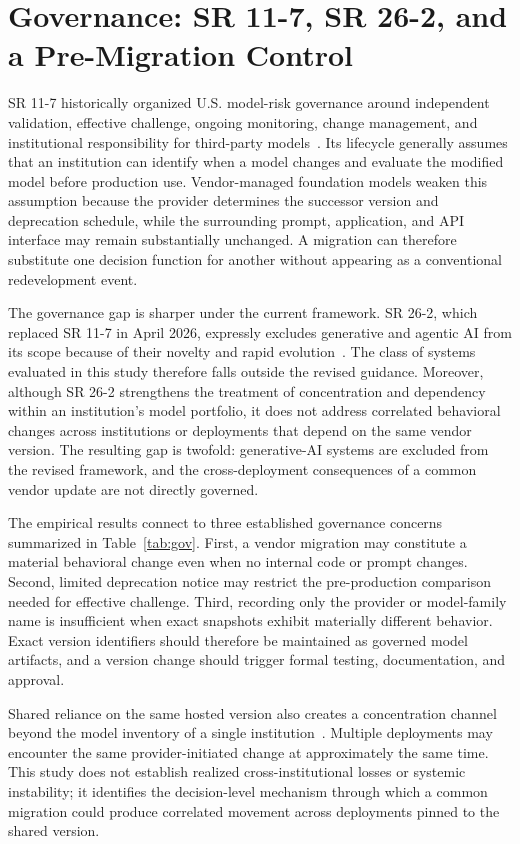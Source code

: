 \documentclass[11pt]{article}
\begin{document}
\section{Governance: SR 11-7, SR 26-2, and a Pre-Migration Control}
\label{sec:gov}
SR 11-7 historically organized U.S. model-risk governance around independent validation, effective challenge, ongoing monitoring, change management, and institutional responsibility for third-party models~\cite{sr117}. Its lifecycle generally assumes that an institution can identify when a model changes and evaluate the modified model before production use. Vendor-managed foundation models weaken this assumption because the provider determines the successor version and deprecation schedule, while the surrounding prompt, application, and API interface may remain substantially unchanged. A migration can therefore substitute one decision function for another without appearing as a conventional redevelopment event.

The governance gap is sharper under the current framework. SR 26-2, which replaced SR 11-7 in April 2026, expressly excludes generative and agentic AI from its scope because of their novelty and rapid evolution~\cite{sr2602}. The class of systems evaluated in this study therefore falls outside the revised guidance. Moreover, although SR 26-2 strengthens the treatment of concentration and dependency within an institution's model portfolio, it does not address correlated behavioral changes across institutions or deployments that depend on the same vendor version. The resulting gap is twofold: generative-AI systems are excluded from the revised framework, and the cross-deployment consequences of a common vendor update are not directly governed.

The empirical results connect to three established governance concerns summarized in Table~\ref{tab:gov}. First, a vendor migration may constitute a material behavioral change even when no internal code or prompt changes. Second, limited deprecation notice may restrict the pre-production comparison needed for effective challenge. Third, recording only the provider or model-family name is insufficient when exact snapshots exhibit materially different behavior. Exact version identifiers should therefore be maintained as governed model artifacts, and a version change should trigger formal testing, documentation, and approval.

Shared reliance on the same hosted version also creates a concentration channel beyond the model inventory of a single institution~\cite{esrb}. Multiple deployments may encounter the same provider-initiated change at approximately the same time. This study does not establish realized cross-institutional losses or systemic instability; it identifies the decision-level mechanism through which a common migration could produce correlated movement across deployments pinned to the shared version.
\end{document}
